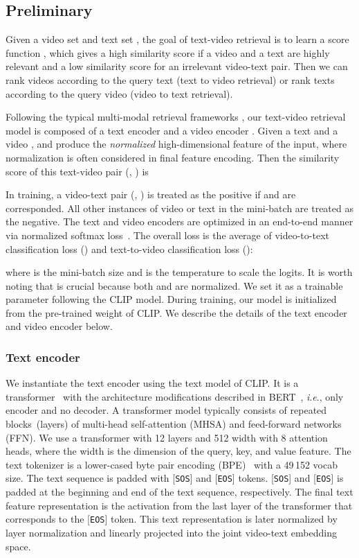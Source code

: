 \documentclass[sigconf]{acmart}
\newcommand{\ie}{\textit{i}.\textit{e}.}
\begin{document}
\subsection{Preliminary}
Given a video set  and text set ,
the goal of text-video retrieval is to learn a score
function , which gives a high similarity score
 if a video  and
a text  are highly relevant
and a low similarity score for an irrelevant video-text pair.
Then we can rank videos according to the query text
(text to video retrieval)
or rank texts according to the query video (video to text retrieval).

Following the typical multi-modal retrieval frameworks
\cite{2021-clip,lei2021less},
our text-video retrieval model is composed of a text encoder 
and a video encoder .
Given a text  and a video ,
 and 
produce the \textit{normalized}
high-dimensional feature of the input,
where  normalization is often considered in final feature encoding.
Then the similarity score of this text-video pair (, ) is

In training, a video-text pair (, ) is treated
as the positive if  and  are corresponded.
All other instances of video or text in the mini-batch are treated as the negative.
The text and video encoders are optimized in an end-to-end manner via normalized
softmax loss~\cite{DBLP:conf/bmvc/ZhaiW19}.
The overall loss  is
the average of video-to-text classification loss () and text-to-video classification loss (): 


where  is the mini-batch size and  is the temperature to scale the logits.
It is worth noting that  is crucial because
both  and  are  normalized.
We set it as a trainable parameter following the CLIP model.
During training, our model is initialized from the pre-trained weight of CLIP.
We describe the details of the text encoder and video encoder below.

\subsubsection{{\textbf{Text encoder}}}
We instantiate the text encoder using the text model of CLIP.
It is a transformer~\cite{DBLP:conf/nips/VaswaniSPUJGKP17}
with the architecture modifications described in BERT~\cite{radford2019language},
\ie, only encoder and no decoder.
A transformer model typically consists of repeated blocks~(layers)
of multi-head self-attention (MHSA) and feed-forward networks (FFN).
We use a transformer with 12 layers and 512 width with 8 attention heads,
where the width is the dimension of the query, key, and value feature.
The text tokenizer is a lower-cased byte pair encoding (BPE)~\cite{2016-bpe}
with a 49\,152 vocab size.
The text sequence is
padded with [\texttt{SOS}] and [\texttt{EOS}] tokens.
[\texttt{SOS}] and [\texttt{EOS}]
is padded at the beginning and end of the text sequence, respectively.
The final text feature representation is the activation from the last layer of the transformer that corresponds to the [\texttt{EOS}] token.
This text representation is later normalized by layer normalization and linearly projected into the joint video-text embedding space.
\end{document}
